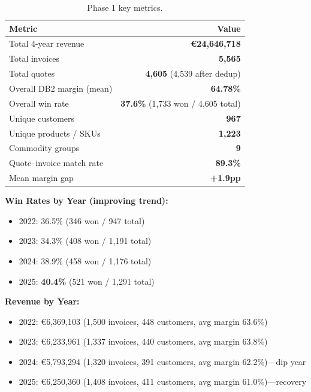 \documentclass[11pt,a4paper]{article}
\newcommand{\EUR}{\euro{}}
\newcommand{\pp}{pp}
\begin{document}
\begin{table}[H]
\centering
\begin{tabular}{lr}
\toprule
\textbf{Metric} & \textbf{Value} \\
\midrule
Total 4-year revenue     & \textbf{\EUR24{,}646{,}718} \\
Total invoices           & \textbf{5{,}565} \\
Total quotes             & \textbf{4{,}605} (4{,}539 after dedup) \\
Overall DB2 margin (mean)& \textbf{64.78\%} \\
Overall win rate         & \textbf{37.6\%} (1{,}733 won / 4{,}605 total) \\
Unique customers         & \textbf{967} \\
Unique products / SKUs   & \textbf{1{,}223} \\
Commodity groups         & \textbf{9} \\
Quote--invoice match rate& \textbf{89.3\%} \\
Mean margin gap          & \textbf{+1.9\pp{}} \\
\bottomrule
\end{tabular}
\caption{Phase 1 key metrics.}
\end{table}

\textbf{Win Rates by Year (improving trend):}
\begin{itemize}[nosep]
  \item 2022: 36.5\% (346 won / 947 total)
  \item 2023: 34.3\% (408 won / 1{,}191 total)
  \item 2024: 38.9\% (458 won / 1{,}176 total)
  \item 2025: \textbf{40.4\%} (521 won / 1{,}291 total)
\end{itemize}

\textbf{Revenue by Year:}
\begin{itemize}[nosep]
  \item 2022: \EUR6{,}369{,}103 (1{,}500 invoices, 448 customers, avg margin 63.6\%)
  \item 2023: \EUR6{,}233{,}961 (1{,}337 invoices, 440 customers, avg margin 63.8\%)
  \item 2024: \EUR5{,}793{,}294 (1{,}320 invoices, 391 customers, avg margin 62.2\%)---dip year
  \item 2025: \EUR6{,}250{,}360 (1{,}408 invoices, 411 customers, avg margin 61.0\%)---recovery
\end{itemize}
\end{document}
